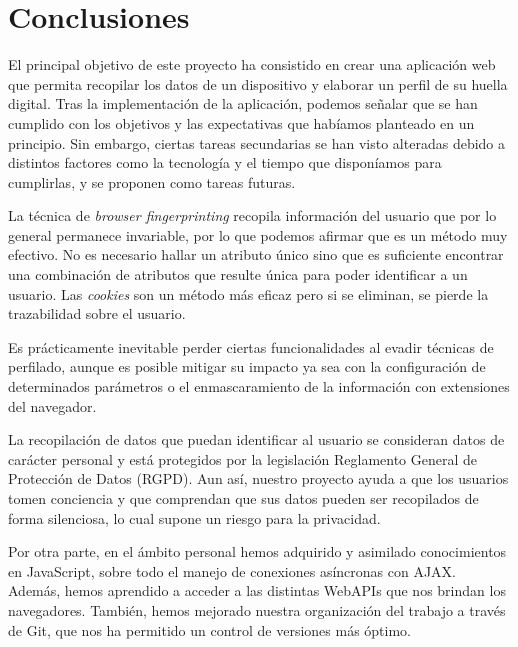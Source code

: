 \chapter{Conclusiones}
\label{ch:conclusiones}
El principal objetivo de este proyecto ha consistido en crear una aplicación web que permita recopilar los datos de un dispositivo y elaborar un perfil de su huella digital. Tras la implementación de la aplicación, podemos señalar que se han cumplido con los objetivos y las expectativas que habíamos planteado en un principio. Sin embargo, ciertas tareas secundarias se han visto alteradas debido a distintos factores como la tecnología y el tiempo que disponíamos para cumplirlas, y se proponen como tareas futuras. \par

La técnica de \textit{browser fingerprinting} recopila información del usuario que por lo general permanece invariable, por lo que podemos afirmar que es un método muy efectivo. No es necesario hallar un atributo único sino que es suficiente encontrar una combinación de atributos que resulte única para poder identificar a un usuario. Las \textit{cookies} son un método más eficaz pero si se eliminan, se pierde la trazabilidad sobre el usuario. \par 

Es prácticamente inevitable perder ciertas funcionalidades al evadir técnicas de perfilado, aunque es posible mitigar su impacto ya sea con la configuración de determinados parámetros o el enmascaramiento de la información con extensiones del navegador. \par 

La recopilación de datos que puedan identificar al usuario se consideran datos de carácter personal y está protegidos por la legislación Reglamento General de Protección de Datos (RGPD). Aun así, nuestro proyecto ayuda a que los usuarios tomen conciencia y que comprendan que sus datos pueden ser recopilados de forma silenciosa, lo cual supone un riesgo para la privacidad. \par

Por otra parte, en el ámbito personal hemos adquirido y asimilado conocimientos en JavaScript, sobre todo el manejo de conexiones asíncronas con AJAX. Además, hemos aprendido a acceder a las distintas WebAPIs que nos brindan los navegadores.
También, hemos mejorado nuestra organización del trabajo a través de Git, que nos ha permitido un control de versiones más óptimo. \par


